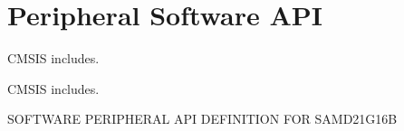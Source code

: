 \hypertarget{group___s_a_m_d21_g16_b__api}{}\section{Peripheral Software A\+PI}
\label{group___s_a_m_d21_g16_b__api}


C\+M\+S\+IS includes.  


C\+M\+S\+IS includes. 

S\+O\+F\+T\+W\+A\+RE P\+E\+R\+I\+P\+H\+E\+R\+AL A\+PI D\+E\+F\+I\+N\+I\+T\+I\+ON F\+OR S\+A\+M\+D21\+G16B 